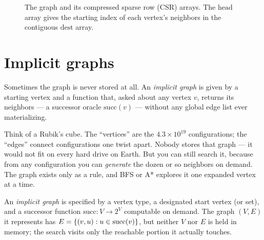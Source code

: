 \begin{figure}[htbp]
\caption{The graph and its compressed sparse row (CSR) arrays. The $\mathrm{head}$ array gives the starting index of each vertex's neighbors in the contiguous $\mathrm{dest}$ array.}
\label{fig:ch01-csr}
\end{figure}

\section{Implicit graphs}
\label{ch01:implicit}

Sometimes the graph is never stored at all. An \emph{implicit graph} is given by
a starting vertex and a function that, asked about any vertex $v$, returns its
neighbors --- a successor oracle $\mathrm{succ}(v)$ --- without any global edge
list ever materializing.

\begin{intuitionbox}
Think of a Rubik's cube. The ``vertices'' are the $4.3\times 10^{19}$
configurations; the ``edges'' connect configurations one twist apart. Nobody
stores that graph --- it would not fit on every hard drive on Earth. But you can
still search it, because from any configuration you can \emph{generate} the dozen
or so neighbors on demand. The graph exists only as a rule, and BFS or A*
explores it one expanded vertex at a time.
\end{intuitionbox}

\begin{definition}
\label{ch01:def-implicit}
An \emph{implicit graph} is specified by a vertex type, a designated start
vertex (or set), and a successor function $\mathrm{succ}: V \to 2^V$ computable
on demand. The graph $(V,E)$ it represents has
$E = \{(v,u) : u \in \mathrm{succ}(v)\}$, but neither $V$ nor $E$ is held in
memory; the search visits only the reachable portion it actually touches.
\end{definition}

